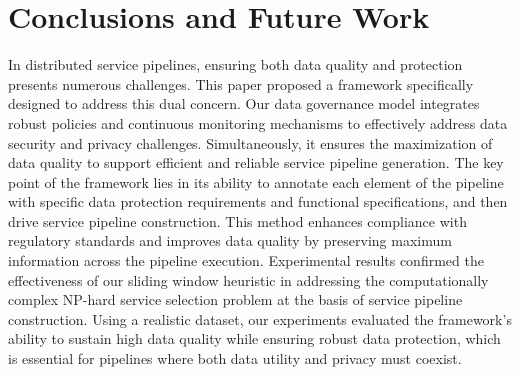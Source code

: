 \documentclass[sn-mathphys-num,referee]{sn-jnl}
\theoremstyle{definition}
\begin{document}












\section{Conclusions and Future Work}\label{sec:conclusions}
{\color{OurColor2}
In distributed service pipelines, ensuring both data quality and protection presents numerous challenges. This paper proposed a framework specifically designed to address this dual concern. Our data governance model integrates robust policies and continuous monitoring mechanisms to effectively address data security and privacy challenges. Simultaneously, it ensures the maximization of data quality to support efficient and reliable service pipeline generation. The key point of the framework lies in its ability to annotate each element of the pipeline with specific data protection requirements and functional specifications, and then drive service pipeline construction. This method enhances compliance with regulatory standards and improves data quality by preserving maximum information across the pipeline execution. Experimental results confirmed the effectiveness of our sliding window heuristic in addressing the computationally complex NP-hard service selection problem at the basis of service pipeline construction. Using a realistic dataset, our experiments evaluated the framework's ability to sustain high data quality while ensuring robust data protection, which is essential for pipelines where both data utility and privacy must coexist.
}
\end{document}
